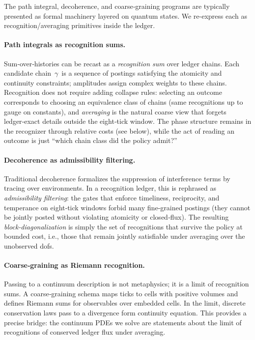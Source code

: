 \documentclass[12pt,a4paper]{article}
\theoremstyle{definition}
\theoremstyle{remark}
\begin{document}
The path integral, decoherence, and coarse‑graining programs are typically presented as formal machinery layered on quantum states. We re-express each as recognition/averaging primitives inside the ledger.

\paragraph{Path integrals as recognition sums.}
Sum‑over‑histories can be recast as a \emph{recognition sum} over ledger chains. Each candidate chain $\,\gamma\,$ is a sequence of postings satisfying the atomicity and continuity constraints; amplitudes assign complex weights to these chains. Recognition does not require adding collapse rules: selecting an outcome corresponds to choosing an equivalence class of chains (same recognitions up to gauge on constants), and \emph{averaging} is the natural coarse view that forgets ledger‑exact details outside the eight‑tick window. The phase structure remains in the recognizer through relative costs (see below), while the act of reading an outcome is just ``which chain class did the policy admit?''

\paragraph{Decoherence as admissibility filtering.}
Traditional decoherence formalizes the suppression of interference terms by tracing over environments. In a recognition ledger, this is rephrased as \emph{admissibility filtering}: the gates that enforce timeliness, reciprocity, and temperance on eight‑tick windows forbid many fine‑grained postings (they cannot be jointly posted without violating atomicity or closed‑flux). The resulting \emph{block‑diagonalization} is simply the set of recognitions that survive the policy at bounded cost, i.e., those that remain jointly satisfiable under averaging over the unobserved dofs.

\paragraph{Coarse‑graining as Riemann recognition.}
Passing to a continuum description is not metaphysics; it is a limit of recognition sums. A coarse‑graining schema maps ticks to cells with positive volumes and defines Riemann sums for observables over embedded cells. In the limit, discrete conservation laws pass to a divergence form continuity equation. This provides a precise bridge: the continuum PDEs we solve are statements about the limit of recognitions of conserved ledger flux under averaging.
\end{document}
